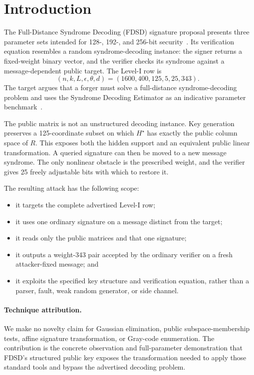 \documentclass[10pt,a4paper]{article}
\begin{document}
\section{Introduction}

The Full-Distance Syndrome Decoding (FDSD) signature proposal presents three
parameter sets intended for 128-, 192-, and 256-bit security~\cite{fdsd}. Its
verification equation resembles a random syndrome-decoding instance: the
signer returns a fixed-weight binary vector, and the verifier checks its
syndrome against a message-dependent public target. The Level-I row is
\[
  (n,k,L,\epsilon,\theta,d)=(1600,400,125,5,25,343).
\]
The target argues that a forger must solve a full-distance syndrome-decoding
problem and uses the Syndrome Decoding Estimator as an indicative parameter
benchmark~\cite{esserbellini}.

The public matrix is not an unstructured decoding instance. Key generation
preserves a 125-coordinate subset on which $H^\star$ has exactly the public
column space of $R$. This exposes both the hidden support and an equivalent
public linear transformation. A queried signature can then be moved to a new
message syndrome. The only nonlinear obstacle is the prescribed weight, and
the verifier gives 25 freely adjustable bits with which to restore it.

The resulting attack has the following scope:
\begin{itemize}
  \item it targets the complete advertised Level-I row;
  \item it uses one ordinary signature on a message distinct from the target;
  \item it reads only the public matrices and that one signature;
  \item it outputs a weight-343 pair accepted by the ordinary verifier on a
        fresh attacker-fixed message; and
  \item it exploits the specified key structure and verification equation,
        rather than a parser, fault, weak random generator, or side channel.
\end{itemize}

\paragraph{Technique attribution.}
We make no novelty claim for Gaussian elimination, public subspace-membership
tests, affine signature transformation, or Gray-code enumeration. The
contribution is the concrete observation and full-parameter demonstration
that FDSD's structured public key exposes the transformation needed to apply
those standard tools and bypass the advertised decoding problem.
\end{document}
